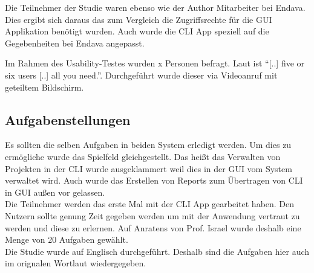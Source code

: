 \documentclass[oneside,bibliography=totocnumbered,BCOR=5mm]{scrbook}
\begin{document}
Die Teilnehmer der Studie waren ebenso wie der Author Mitarbeiter bei
Endava. Dies ergibt sich daraus das zum Vergleich die Zugriffsrechte für die
GUI Applikation benötigt wurden. Auch wurde die CLI App speziell auf die
Gegebenheiten bei Endava angepasst.

Im Rahmen des Usability-Testes wurden x Personen befragt. Laut
\cite[11]{Spolsky_2001} ist ``[..] five or six users [..] all you need.''.
Durchgeführt wurde dieser via Videoanruf mit geteiltem Bildschirm.


\subsection{Aufgabenstellungen}
\label{aufgaben}

Es sollten die selben Aufgaben in beiden System erledigt werden. Um dies zu
ermögliche wurde das Spielfeld gleichgestellt. Das heißt das Verwalten von
Projekten in der CLI wurde ausgeklammert weil dies in der GUI vom System
verwaltet wird. Auch wurde das Erstellen von Reports zum Übertragen von CLI in
GUI außen vor gelassen.
\\
Die Teilnehmer werden das erste Mal mit der CLI App gearbeitet haben. Den
Nutzern sollte genung Zeit gegeben werden um mit der Anwendung vertraut zu
werden und diese zu erlernen. Auf Anratens von Prof. Israel wurde deshalb eine
Menge von 20 Aufgaben gewählt.
\\
Die Studie wurde auf Englisch durchgeführt. Deshalb sind die Aufgaben hier auch
im orignalen Wortlaut wiedergegeben.
\end{document}
